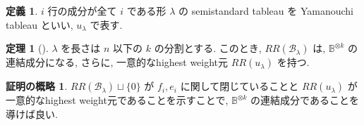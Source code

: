 \documentclass[
  a4paper, 
  12pt,
  ja=standard,
  xelatex,
  left=30truemm,
  right=30truemm,
  titlepage 
]{bxjsarticle}
\theoremstyle{definition}
\newtheorem{df}{定義}
\newtheorem{thm}{定理}
\newtheorem*{prf}{証明の概略}
\begin{document}
\begin{df}
  $i$ 行の成分が全て $i$ である形 $\lambda$ の semistandard tableau を Yamanouchi tableau といい, $u_\lambda$ で表す.
\end{df}

\begin{thm}[{\cite[定理3.2]{b1}}] 
  $\lambda$ を長さは $n$ 以下の $k$ の分割とする.
  このとき, $RR(\mathscr{B}_{\lambda})$ は, $\mathbb{B}^{\otimes k}$ の連結成分になる, 
  さらに, 一意的なhighest weight元 $RR(u_\lambda)$ を持つ.
\end{thm}

\begin{prf}
  $RR(\mathscr{B}_{\lambda}) \sqcup \{ 0 \}$ が $f_i, e_i$ に関して閉じていることと $RR(u_\lambda)$
  が一意的なhighest weight元であることを示すことで, $\mathbb{B}^{\otimes k}$ の連結成分であることを導けば良い.
\end{prf}
\end{document}
